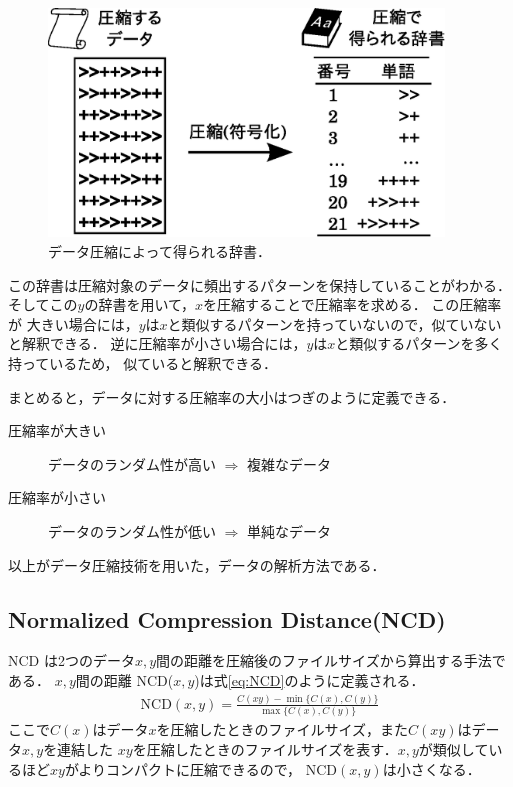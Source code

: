 \begin{figure}[tb]
\begin{center}
\includegraphics[width=10.5cm]{image/dic.eps}
\end{center}
\caption{データ圧縮によって得られる辞書．}
\label{dic}
\end{figure}
この辞書は圧縮対象のデータに頻出するパターンを保持していることがわかる．
そしてこの$y$の辞書を用いて，$x$を圧縮することで圧縮率を求める．
この圧縮率が
大きい場合には，$y$は$x$と類似するパターンを持っていないので，似ていないと解釈できる．
逆に圧縮率が小さい場合には，$y$は$x$と類似するパターンを多く持っているため，
似ていると解釈できる．

まとめると，データに対する圧縮率の大小はつぎのように定義できる．
\begin{description}
	\item [圧縮率が大きい] データのランダム性が高い $\Rightarrow$ 複雑なデータ
	\item [圧縮率が小さい] データのランダム性が低い $\Rightarrow$ 単純なデータ
\end{description}
以上がデータ圧縮技術を用いた，データの解析方法である．


\subsection{Normalized Compression Distance(NCD)}
\label{subsec:NCD}

NCD \cite{NCD} は2つのデータ$x,y$間の距離を圧縮後のファイルサイズから算出する手法である．
$x,y$間の距離 NCD($x,y$)は式\ref{eq:NCD}のように定義される．
\begin{eqnarray}
\mathrm{NCD}(x,y) = \frac{C(xy) - \min\{C(x),C(y)\}}{\max\{C(x),C(y)\}} \label{eq:NCD}
\end{eqnarray}
ここで$C(x)$はデータ$x$を圧縮したときのファイルサイズ，また$C(xy)$はデータ$x,y$を連結した
$xy$を圧縮したときのファイルサイズを表す．$x,y$が類似しているほど$xy$がよりコンパクトに圧縮できるので，
$\mbox{NCD}(x,y)$は小さくなる．

